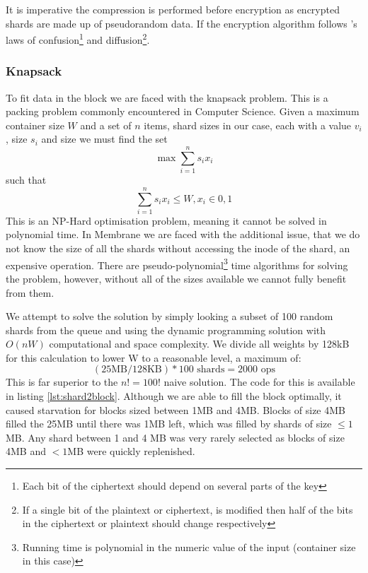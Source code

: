 \documentclass[11pt, a4paper, twocolumn, twoside]{report}
\begin{document}
It is imperative the compression is performed before encryption as encrypted shards are made up of pseudorandom data. If the encryption algorithm follows \cite{shannon1945mathematical}'s laws of confusion\footnote{Each bit of the ciphertext should depend on several parts of the key} and diffusion\footnote{If a single bit of the plaintext or ciphertext, is modified then half of the bits in the ciphertext or plaintext should change respectively}.

\subsubsection{Knapsack}

To fit data in the block we are faced with the knapsack problem. This is a packing problem commonly encountered in Computer Science. \citep{skiena1999interested} Given a maximum container size $W$ and a set of $n$ items, shard sizes in our case, each with a value $v_i$, size $s_i$ and size we must find the set 
$$\max \sum_{i=1}^{n} s_{i}x_{i}$$ 
such that 
$$\sum_{i=1}^{n} s_{i}x_{i} \leq W, x_i \in {0, 1}$$
This is an NP-Hard optimisation problem, \citep{skiena1999interested} meaning it cannot be solved in polynomial time. In Membrane we are faced with the additional issue, that we do not know the size of all the shards without accessing the inode of the shard, an expensive operation. There are pseudo-polynomial\footnote{Running time is polynomial in the numeric value of the input (container size in this case)} time algorithms for solving the problem, however, without all of the sizes available we cannot fully benefit from them.

We attempt to solve the solution by simply looking a subset of 100 random shards from the queue and using the dynamic programming solution with $O(nW)$ computational and space complexity. \citep{martello1999dynamic} We divide all weights by 128kB for this calculation to lower W to a reasonable level, a maximum of: 
$$(25\mbox{MB} / 128\mbox{KB}) * 100  \mbox{ shards} = 2000 \mbox{ ops}$$ 
This is far superior to the $n! = 100!$ naive solution. The code for this is available in listing \ref{lst:shard2block}. Although we are able to fill the block optimally, it caused starvation for blocks sized between 1MB and 4MB. Blocks of size 4MB filled the 25MB until there was 1MB left, which was filled by shards of size $\leq1$MB. Any shard between 1 and 4 MB was very rarely selected as blocks of size 4MB and $<1$MB were quickly replenished.
\end{document}

